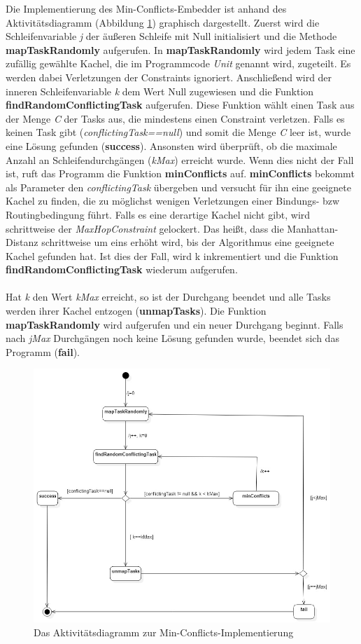 Die Implementierung des Min-Conflicts-Embedder ist anhand des Aktivitätsdiagramm (Abbildung \ref{fig:minConflictsAkti}) graphisch dargestellt. Zuerst wird die Schleifenvariable \textit{j} der äußeren Schleife mit Null initialisiert und die Methode \textbf{mapTaskRandomly} aufgerufen. In \textbf{mapTaskRandomly} wird jedem Task eine zufällig gewählte Kachel, die im Programmcode \textit{Unit} genannt wird, zugeteilt. Es werden dabei Verletzungen der Constraints ignoriert. Anschließend wird der inneren Schleifenvariable \textit{k} dem Wert Null zugewiesen und die Funktion \textbf{findRandomConflictingTask} aufgerufen. Diese Funktion wählt einen Task aus der Menge \textit{C} der Tasks aus, die mindestens einen Constraint verletzen. Falls es keinen Task gibt (\textit{conflictingTask==null}) und somit die Menge \textit{C} leer ist, wurde eine Lösung gefunden (\textbf{success}). Ansonsten wird überprüft, ob die maximale Anzahl an Schleifendurchgängen (\textit{kMax}) erreicht wurde. Wenn dies nicht der Fall ist, ruft das Programm die Funktion \textbf{minConflicts} auf. \textbf{minConflicts} bekommt als Parameter den \textit{conflictingTask} übergeben und versucht für ihn eine geeignete Kachel zu finden, die zu möglichst wenigen Verletzungen einer Bindungs- bzw Routingbedingung führt. Falls es eine derartige Kachel nicht gibt, wird schrittweise der \textit{MaxHopConstraint} gelockert. Das heißt, dass die Manhattan-Distanz schrittweise um eins erhöht wird, bis der Algorithmus eine geeignete Kachel gefunden hat. Ist dies der Fall, wird k inkrementiert und die Funktion \textbf{findRandomConflictingTask} wiederum aufgerufen. \\
\\
Hat \textit{k} den Wert \textit{kMax} erreicht, so ist der Durchgang beendet und alle Tasks werden ihrer Kachel entzogen (\textbf{unmapTasks}). Die Funktion \textbf{mapTaskRandomly} wird aufgerufen und ein neuer Durchgang beginnt. Falls nach \textit{jMax} Durchgängen noch keine Lösung gefunden wurde, beendet sich das Programm (\textbf{fail}).

\begin{figure}[H]\centering
  \includegraphics[width = 150mm]{bilder/minAkti.jpg}
  \caption{Das Aktivitätsdiagramm zur Min-Conflicts-Implementierung}\label{fig:minConflictsAkti}
\end{figure}